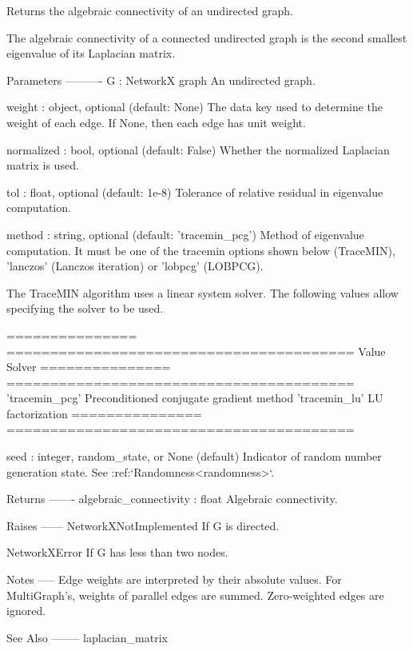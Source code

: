 \begin{DoxyVerb}Returns the algebraic connectivity of an undirected graph.

The algebraic connectivity of a connected undirected graph is the second
smallest eigenvalue of its Laplacian matrix.

Parameters
----------
G : NetworkX graph
    An undirected graph.

weight : object, optional (default: None)
    The data key used to determine the weight of each edge. If None, then
    each edge has unit weight.

normalized : bool, optional (default: False)
    Whether the normalized Laplacian matrix is used.

tol : float, optional (default: 1e-8)
    Tolerance of relative residual in eigenvalue computation.

method : string, optional (default: 'tracemin_pcg')
    Method of eigenvalue computation. It must be one of the tracemin
    options shown below (TraceMIN), 'lanczos' (Lanczos iteration)
    or 'lobpcg' (LOBPCG).

    The TraceMIN algorithm uses a linear system solver. The following
    values allow specifying the solver to be used.

    =============== ========================================
    Value           Solver
    =============== ========================================
    'tracemin_pcg'  Preconditioned conjugate gradient method
    'tracemin_lu'   LU factorization
    =============== ========================================

seed : integer, random_state, or None (default)
    Indicator of random number generation state.
    See :ref:`Randomness<randomness>`.

Returns
-------
algebraic_connectivity : float
    Algebraic connectivity.

Raises
------
NetworkXNotImplemented
    If G is directed.

NetworkXError
    If G has less than two nodes.

Notes
-----
Edge weights are interpreted by their absolute values. For MultiGraph's,
weights of parallel edges are summed. Zero-weighted edges are ignored.

See Also
--------
laplacian_matrix
\end{DoxyVerb}
 \mbox{\label{namespacenetworkx_1_1linalg_1_1algebraicconnectivity_a862b00cdd972ff366199b0e3b8a42a4c}} 
